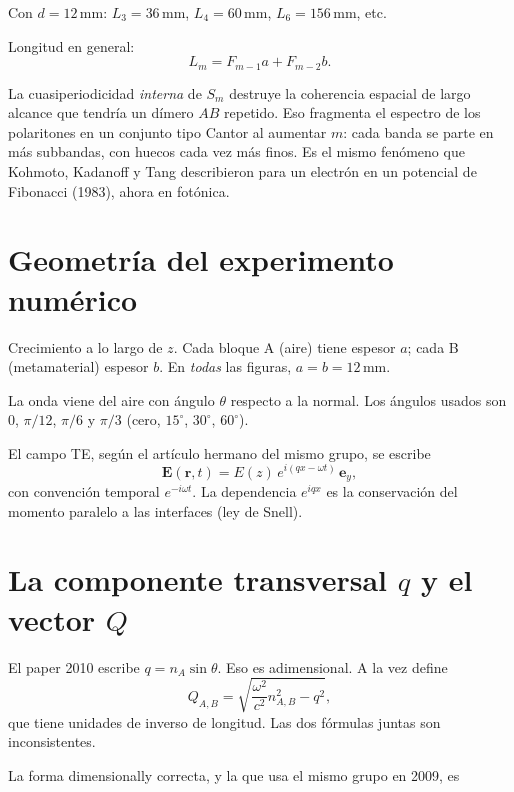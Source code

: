 \documentclass[11pt,a4paper]{article}
\begin{document}
Con \(d=12\,\mathrm{mm}\): \(L_3=36\,\mathrm{mm}\), \(L_4=60\,\mathrm{mm}\),
\(L_6=156\,\mathrm{mm}\), etc.

Longitud en general:
\begin{equation}
L_m=F_{m-1}a+F_{m-2}b.
\end{equation}

La cuasiperiodicidad \emph{interna} de \(S_m\) destruye la coherencia espacial
de largo alcance que tendría un dímero \(AB\) repetido.
Eso fragmenta el espectro de los polaritones en un conjunto tipo Cantor al
aumentar \(m\): cada banda se parte en más subbandas, con huecos cada vez más
finos. Es el mismo fenómeno que Kohmoto, Kadanoff y Tang describieron para un
electrón en un potencial de Fibonacci (1983), ahora en fotónica.

\section{Geometría del experimento numérico}

Crecimiento a lo largo de \(z\). Cada bloque A (aire) tiene espesor \(a\);
cada B (metamaterial) espesor \(b\). En \emph{todas} las figuras,
\(a=b=12\,\mathrm{mm}\).

La onda viene del aire con ángulo \(\theta\) respecto a la normal.
Los ángulos usados son \(0\), \(\pi/12\), \(\pi/6\) y \(\pi/3\)
(cero, \(15^\circ\), \(30^\circ\), \(60^\circ\)).

El campo TE, según el artículo hermano del mismo grupo, se escribe
\begin{equation}
\mathbf{E}(\mathbf{r},t)=E(z)\,e^{i(qx-\omega t)}\,\mathbf{e}_y,
\end{equation}
con convención temporal \(e^{-i\omega t}\).
La dependencia \(e^{iqx}\) es la conservación del momento paralelo a las
interfaces (ley de Snell).

\section{La componente transversal \(q\) y el vector \(Q\)}

El paper 2010 escribe \(q=n_A\sin\theta\). Eso es adimensional.
A la vez define
\begin{equation}
Q_{A,B}=\sqrt{\frac{\omega^2}{c^2}n_{A,B}^2-q^2},
\end{equation}
que tiene unidades de inverso de longitud.
Las dos fórmulas juntas son inconsistentes.

La forma dimensionally correcta, y la que usa el mismo grupo en 2009, es
\end{document}
